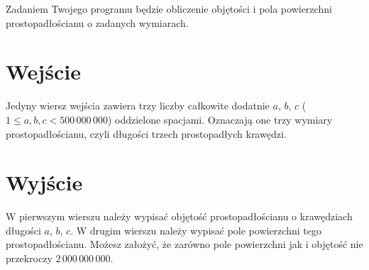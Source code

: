 \documentclass{spiral-kurs}
\begin{document}
\makeheader
%
  Zadaniem Twojego programu będzie obliczenie objętości i pola powierzchni prostopadłościanu 
  o zadanych wymiarach.
  
  \section{Wejście}
  Jedyny wiersz wejścia zawiera trzy liczby całkowite dodatnie $a$, $b$, $c$
  ($1 \le a,b,c < 500\,000\,000$) oddzielone spacjami.
  Oznaczają one trzy wymiary prostopadłościanu, czyli długości trzech prostopadłych krawędzi.

  \section{Wyjście}
  W pierwszym wierszu należy wypisać objętość prostopadłościanu o 
  krawędziach długości $a$, $b$, $c$.
  W drugim wierszu należy wypisać pole powierzchni tego prostopadłościanu.
  Możesz założyć, że zarówno pole powierzchni jak i objętość nie przekroczy
  $2\,000\,000\,000$.
                                  


  
\end{document}

